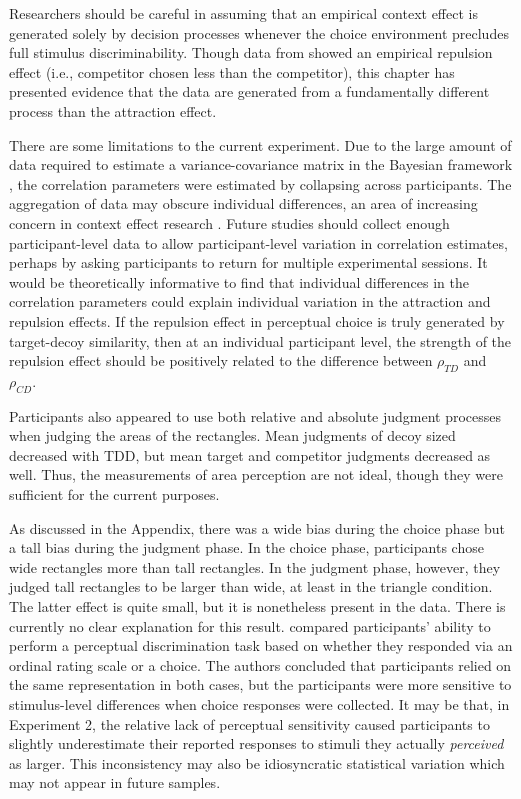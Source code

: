 Researchers should be careful in assuming that an empirical context effect is generated solely by decision processes whenever the choice environment precludes full stimulus discriminability. Though data from \textcite{spektorWhenGoodLooks2018b} showed an empirical repulsion effect (i.e., competitor chosen less than the competitor), this chapter has presented evidence that the data are generated from a fundamentally different process than the attraction effect. 

There are some limitations to the current experiment. Due to the large amount of data required to estimate a variance-covariance matrix in the Bayesian framework \parencite{martin2021,merkle2023opaque}, the correlation parameters were estimated by collapsing across participants. The aggregation of data may obscure individual differences, an area of increasing concern in context effect research \parencite{liewAppropriacyAveragingStudy2016b,trueblood2015fragile,davis2023illustrated}. Future studies should collect enough participant-level data to allow participant-level variation in correlation estimates, perhaps by asking participants to return for multiple experimental sessions. It would be theoretically informative to find that individual differences in the correlation parameters could explain individual variation in the attraction and repulsion effects. If the repulsion effect in perceptual choice is truly generated by target-decoy similarity, then at an individual participant level, the strength of the repulsion effect should be positively related to the difference between $\rho_{TD}$ and $\rho_{CD}$. 

Participants also appeared to use both relative and absolute judgment processes when judging the areas of the rectangles. Mean judgments of decoy sized decreased with TDD, but mean target and competitor judgments decreased as well. Thus, the measurements of area perception are not ideal, though they were sufficient for the current purposes. 

As discussed in the Appendix, there was a wide bias during the choice phase but a tall bias during the judgment phase. In the choice phase, participants chose wide rectangles more than tall rectangles. In the judgment phase, however, they judged tall rectangles to be larger than wide, at least in the triangle condition. The latter effect is quite small, but it is nonetheless present in the data. There is currently no clear explanation for this result. \textcite{gronau2023choice} compared participants' ability to perform a perceptual discrimination task based on whether they responded via an ordinal rating scale or a choice. The authors concluded that participants relied on the same representation in both cases, but the participants were more sensitive to stimulus-level differences when choice responses were collected. It may be that, in Experiment 2, the relative lack of perceptual sensitivity caused participants to slightly underestimate their reported responses to stimuli they actually \textit{perceived} as larger. This inconsistency may also be idiosyncratic statistical variation which may not appear in future samples. 

